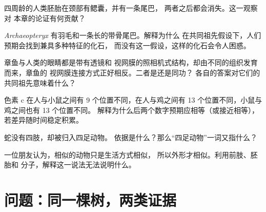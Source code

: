 \begin{exercise}[$\star\star$]\label{exo:g10:common-ancestry:10}
四周龄的人类胚胎在颈部有鳃囊，并有一条尾巴，
两者之后都会消失。这一观察对
本章的论证有何贡献？
\end{exercise}

\begin{exercise}[$\star\star$]\label{exo:g10:common-ancestry:11}
\emph{Archaeopteryx} 有羽毛和一条长的带骨尾巴。解释为什么
在共同祖先假设下，人们预期会找到兼具多种特征的化石，
而没有这一假设，这样的化石会令人困惑。
\end{exercise}

\begin{exercise}[$\star\star\star$]\label{exo:g10:common-ancestry:12}
章鱼与人类的眼睛都是带有透镜和
视网膜的照相机式结构，却由不同的组织发育而来，章鱼的
视网膜连接方式正好相反。二者是还是同功？
各自的答案对它们的共同祖先意味着什么？
\end{exercise}

\begin{exercise}[$\star\star\star$]\label{exo:g10:common-ancestry:13}
色素 c 在人与小鼠之间有 9 个位置不同，在人与鸡之间有
13 个位置不同，小鼠与鸡之间也有 13 个位置不同。
解释为什么后两个数字预期应相等（或接近相等），
若差异随时间稳定积累。
\end{exercise}

\begin{exercise}[$\star\star\star$]\label{exo:g10:common-ancestry:14}
蛇没有四肢，却被归入四足动物。
依据是什么？那么“四足动物”一词又指什么？
\end{exercise}

\begin{exercise}[$\star\star\star$]\label{exo:g10:common-ancestry:15}
一位朋友认为，相似的动物只是生活方式相似，
所以外形才相似。利用前肢、胚胎和
分子，解释这一说法无法说明什么。
\end{exercise}

\section{问题：同一棵树，两类证据}

